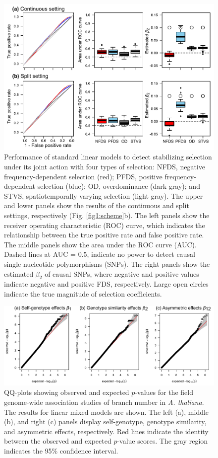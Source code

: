 \documentclass[12pt,]{article}
\begin{document}
\begin{figure}[]
  \includegraphics[width=\linewidth]{FigS7_beta1LMdomi.pdf}
  \caption{Performance of standard linear models to detect stabilizing selection under its joint action with four types of selection:  NFDS, negative frequency-dependent selection (red); PFDS, positive frequency-dependent selection (blue); OD, overdominance (dark gray); and STVS, spatiotemporally varying selection (light gray). The upper and lower panels show the results of the continuous and split settings, respectively (Fig. \ref{fig1:scheme}b). The left panels show the receiver operating characteristic (ROC) curve, which indicates the relationship between the true positive rate and false positive rate. The middle panels show the area under the ROC curve (AUC). Dashed lines at AUC = 0.5, indicate no power to detect causal single nucleotide polymorphisms (SNPs). The right panels show the estimated $\beta_2$ of causal SNPs, where negative and positive values indicate negative and positive FDS, respectively. Large open circles indicate the true magnitude of selection coefficients.}
  \label{figS7:beta1LM}
\end{figure}


\begin{figure}[]
  \includegraphics[width=\linewidth]{FigS8_QQplotLMM.png}
  \caption{QQ-plots showing observed and expected $p$-values for the field genome-wide association studies of branch number in \textit{A. thaliana}. The results for linear mixed models are shown. The left (a), middle (b), and right (c) panels display self-genotype, genotype similarity, and asymmetric effects, respectively. Red lines indicate the identity between the observed and expected $p$-value scores. The gray region indicates the 95\% confidence interval.}
  \label{figS9:QQplotLMM}
\end{figure}
\end{document}
